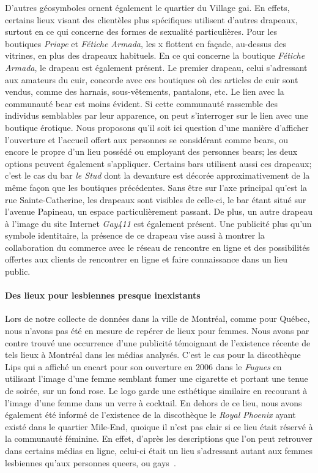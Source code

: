 D'autres géosymboles \lgbt{} ornent également le quartier du Village gai.
En effets, certains lieux visant des clientèles plus spécifiques utilisent d'autres drapeaux, surtout en ce qui concerne des formes de sexualité particulières.
Pour les boutiques \emph{Priape} et \emph{Fétiche Armada}, les x  flottent en façade, au-dessus des vitrines, en plus des drapeaux  habituels.
En ce qui concerne la boutique \emph{Fétiche Armada}, le drapeau  est également présent.
Le premier drapeau, celui s'adressant aux amateurs du cuir, concorde avec ces boutiques où des articles de cuir sont vendus, comme des harnais, sous-vêtements, pantalons, etc.
Le lien avec la communauté bear est moins évident.
Si cette communauté rassemble des individus semblables par leur apparence, on peut s'interroger sur le lien avec une boutique érotique.
Nous proposons qu'il soit ici question d'une manière d'afficher l'ouverture et l'accueil offert aux personnes se considérant comme bears, ou encore le propre d'un lieu possédé ou employant des personnes bears; les deux options peuvent également s'appliquer.
Certains bars utilisent aussi ces drapeaux; c'est le cas du bar \emph{le Stud} dont la devanture est décorée approximativement de la même façon que les boutiques précédentes.
Sans être sur l'axe principal qu'est la rue Sainte-Catherine, les drapeaux sont visibles de celle-ci, le bar étant situé sur l'avenue Papineau, un espace particulièrement passant.
De plus, un autre drapeau à l'image du site Internet \emph{Gay411} est également présent.
Une publicité plus qu'un symbole identitaire, la présence de ce drapeau vise aussi à montrer la collaboration du commerce avec le réseau de rencontre en ligne et des possibilités offertes aux clients de rencontrer en ligne et faire connaissance dans un lieu public.

\paragraph{Des lieux pour lesbiennes presque inexistants}
Lors de notre collecte de données dans la ville de Montréal, comme pour Québec, nous n'avons pas été en mesure de repérer de lieux pour femmes.
Nous avons par contre trouvé une occurrence d'une publicité témoignant de l'existence récente de tels lieux à Montréal dans les médias analysés.
C'est le cas pour la discothèque Lips qui a affiché un encart pour son ouverture en 2006 dans le \emph{Fugues} en utilisant l'image d'une femme semblant fumer une cigarette et portant une tenue de soirée, sur un fond rose.
Le logo garde une esthétique similaire en recourant à l'image d'une femme dans un verre à cocktail.
En dehors de ce lieu, nous avons également été informé de l'existence de la discothèque le \emph{Royal Phoenix} ayant existé dans le quartier Mile-End, quoique il n'est pas clair si ce lieu était réservé à la communauté féminine.
En effet, d'après les descriptions que l'on peut retrouver dans certains médias en ligne, celui-ci était un lieu s'adressant autant aux femmes lesbiennes qu'aux personnes queers,  ou gays~\citep{CultMTL2014}.

